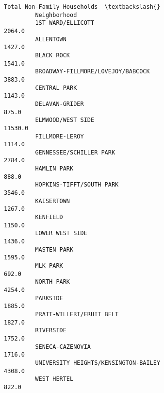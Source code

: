 \documentclass[11pt]{article}
\begin{document}
\begin{Verbatim}[commandchars=\\\{\}]
                                               Total Non-Family Households  \textbackslash{}
         Neighborhood                                                        
         1ST WARD/ELLICOTT                                          2064.0   
         ALLENTOWN                                                  1427.0   
         BLACK ROCK                                                 1541.0   
         BROADWAY-FILLMORE/LOVEJOY/BABCOCK                          3883.0   
         CENTRAL PARK                                               1143.0   
         DELAVAN-GRIDER                                              875.0   
         ELMWOOD/WEST SIDE                                         11530.0   
         FILLMORE-LEROY                                             1114.0   
         GENNESSEE/SCHILLER PARK                                    2784.0   
         HAMLIN PARK                                                 888.0   
         HOPKINS-TIFFT/SOUTH PARK                                   3546.0   
         KAISERTOWN                                                 1267.0   
         KENFIELD                                                   1150.0   
         LOWER WEST SIDE                                            1436.0   
         MASTEN PARK                                                1595.0   
         MLK PARK                                                    692.0   
         NORTH PARK                                                 4254.0   
         PARKSIDE                                                   1885.0   
         PRATT-WILLERT/FRUIT BELT                                   1827.0   
         RIVERSIDE                                                  1752.0   
         SENECA-CAZENOVIA                                           1716.0   
         UNIVERSITY HEIGHTS/KENSINGTON-BAILEY                       4308.0   
         WEST HERTEL                                                 822.0   
         

\end{Verbatim}
\end{document}
